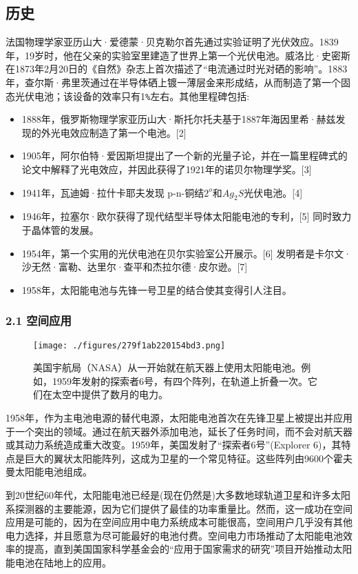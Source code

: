 \subsection{历史}

法国物理学家亚历山大·爱德蒙·贝克勒尔首先通过实验证明了光伏效应。1839年，19岁时，他在父亲的实验室里建造了世界上第一个光伏电池。威洛比·史密斯在1873年2月20日的《自然》杂志上首次描述了“电流通过时光对硒的影响”。1883年，查尔斯·弗里茨通过在半导体硒上镀一薄层金来形成结，从而制造了第一个固态光伏电池；该设备的效率只有1\verb|%|左右。其他里程碑包括:

\begin{itemize}
\item 1888年，俄罗斯物理学家亚历山大·斯托尔托夫基于1887年海因里希·赫兹发现的外光电效应制造了第一个电池。[2]
\item 1905年，阿尔伯特·爱因斯坦提出了一个新的光量子论，并在一篇里程碑式的论文中解释了光电效应，并因此获得了1921年的诺贝尔物理学奖。[3]
\item 1941年，瓦迪姆·拉什卡耶夫发现 p-n-铜结$2^o$和$Ag_2S$光伏电池。[4]
\item 1946年，拉塞尔·欧尔获得了现代结型半导体太阳能电池的专利，[5] 同时致力于晶体管的发展。
\item 1954年，第一个实用的光伏电池在贝尔实验室公开展示。[6] 发明者是卡尔文·沙无然·富勒、达里尔·查平和杰拉尔德·皮尔逊。[7]
\item 1958年，太阳能电池与先锋一号卫星的结合使其变得引人注目。
\end{itemize}


\subsubsection{2.1 空间应用}

\begin{figure}[ht]
\centering
\texttt{[image: ./figures/279f1ab220154bd3.png]}
\caption{美国宇航局（NASA）从一开始就在航天器上使用太阳能电池。例如，1959年发射的探索者6号，有四个阵列，在轨道上折叠一次。它们在太空中提供了数月的电力。} \label{fig_TYNDC_16}
\end{figure}

1958年，作为主电池电源的替代电源，太阳能电池首次在先锋卫星上被提出并应用于一个突出的领域。通过在航天器外添加电池，延长了任务时间，而不会对航天器或其动力系统造成重大改变。1959年，美国发射了“探索者6号”(Explorer 6)，其特点是巨大的翼状太阳能阵列，这成为卫星的一个常见特征。这些阵列由9600个霍夫曼太阳能电池组成。

到20世纪60年代，太阳能电池已经是(现在仍然是)大多数地球轨道卫星和许多太阳系探测器的主要能源，因为它们提供了最佳的功率重量比。然而，这一成功在空间应用是可能的，因为在空间应用中电力系统成本可能很高，空间用户几乎没有其他电力选择，并且愿意为尽可能最好的电池付费。空间电力市场推动了太阳能电池效率的提高，直到美国国家科学基金会的“应用于国家需求的研究”项目开始推动太阳能电池在陆地上的应用。

